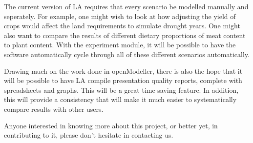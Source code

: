 The current version of LA requires that every scenario be modelled
manually and seperately.  For example, one might wish to look at how adjusting
the yield of crops would affect the land requirements to simulate drought
years.  One might also want to compare the results of different dietary
proportions of meat content to plant content.  With the experiment module, it
will be possible to have the software automatically cycle through all of these
different scenarios automatically.

Drawing much on the work done in openModeller, there is also the hope that it
will be possible to have LA compile presentation quality reports,
complete with spreadsheets and graphs.  This will be a great time saving
feature.  In addition, this will provide a consistency that will make it much
easier to systematically compare results with other users.

Anyone interested in knowing more about this project, or better yet, in
contributing to it, please don't hesitate in contacting us.











\begin{footnotesize}



\end{footnotesize}


\address{Jason Jorgenson\\ University of Liverpool\\
\url{http://www.arkygeek.com} (under development)\\
}

\address{Tim Sutton\\ Centro de Referncia em Informao Ambiental, CRIA\\
\url{http://cria.org.br}\\
}

